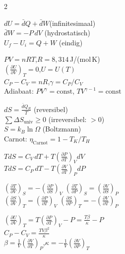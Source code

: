 \documentclass[10pt,a4paper]{article}
\newcommand{\dbar}{\bar{d}}
\newcommand{\pder}[2]{\left(\frac{\partial #1}{\partial #2}\right)}
\begin{document}
\begin{multicols}{2}

\begin{keyformulas}[title=Eerste Wet]
$dU = \dbar Q + \dbar W$\quad (infinitesimaal)\\
$\dbar W = -P\,dV$\; (hydrostatisch)\\
$U_f - U_i = Q + W$\; (eindig)
\end{keyformulas}

\begin{keyformulas}[title=Ideaal Gas]
$PV = nRT$,\quad $R = 8{,}314$\,J/(mol\,K)\\
$\left(\frac{\partial U}{\partial V}\right)_T = 0$,\quad $U = U(T)$ \\
$C_P - C_V = nR$,\quad $\gamma = C_P/C_V$\\
Adiabaat: $PV^\gamma = \text{const}$,\; $TV^{\gamma-1}=\text{const}$
\end{keyformulas}

\begin{keyformulas}[title=Entropie \& 2e Wet]
$dS = \frac{\dbar Q_R}{T}$\; (reversibel)\\
$\sum \Delta S_{\text{univ}} \geq 0$\; (irreversibel: $>0$)\\
$S = k_B \ln\Omega$ \; (Boltzmann)\\
Carnot: $\eta_\text{Carnot} = 1 - T_K/T_H$
\end{keyformulas}

\begin{keyformulas}[title=TdS-vergelijkingen]
$TdS = C_V\,dT + T\pder{P}{T}_V dV$\\
$TdS = C_P\,dT - T\pder{V}{T}_P dP$
\end{keyformulas}

\begin{keyformulas}[title=Maxwell-betrekkingen]
$\pder{T}{V}_S = -\pder{P}{S}_V$ \quad
$\pder{T}{P}_S = \pder{V}{S}_P$\\
$\pder{S}{V}_T = \pder{P}{T}_V$ \quad
$\pder{S}{P}_T = -\pder{V}{T}_P$
\end{keyformulas}

\begin{keyformulas}[title=Energievergelijkingen]
$\pder{U}{V}_T = T\pder{P}{T}_V - P = \frac{T\beta}{\kappa} - P$\\
$C_P - C_V = \frac{TV\beta^2}{\kappa}$\\
$\beta = \frac{1}{V}\pder{V}{T}_P$,\quad $\kappa = -\frac{1}{V}\pder{V}{P}_T$
\end{keyformulas}


\end{multicols}
\end{document}
